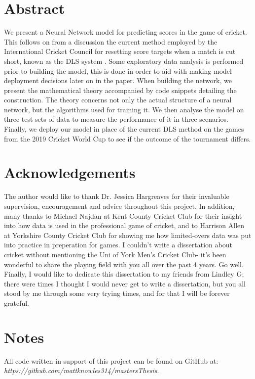 \documentclass[11pt]{report}
\begin{document}


\section*{Abstract}
We present a Neural Network model for predicting scores in the game of cricket. This follows on from a discussion the current method employed by the International Cricket Council for resetting score targets when a match is cut short, known as the DLS system \cite{stern}.
Some exploratory data analysis is performed prior to building the model, this is done in order to aid with making model deployment 
decisions later on in the paper. When building the network, we present the mathematical theory accompanied by code snippets detailing the construction. The theory concerns not only the actual structure of a neural network, but the algorithms used for training it.
We then analyse the model on three test sets of data to measure the performance of it in three scenarios. Finally, we deploy our model in place of the current DLS method on the games from the 2019 Cricket World Cup to see if the outcome of the tournament differs. 

\section*{Acknowledgements}
The author would like to thank Dr. Jessica Hargreaves for their invaluable supervision, encouragement and advice throughout this project. In addition,
many thanks to Michael Najdan at Kent County Cricket Club for their insight into how data is used in the professional game of cricket, and to Harrison Allen at Yorkshire County Cricket Club for showing me how limited-overs data was put into practice in preperation for games. 
I couldn't write a dissertation about cricket without mentioning the Uni of York Men's Cricket Club- it's been wonderful to share the playing field with you all over the past 4 years. Go well.
Finally, I would like to dedicate this dissertation to my friends from Lindley G; there were times I thought I would never get to write a dissertation, but you all stood by me through some very trying times, and for that I will be forever grateful. 

\section*{Notes}
All code written in support of this project can be found on GitHub at: \\
\textit{https://github.com/mattknowles314/mastersThesis}.
\end{document}
